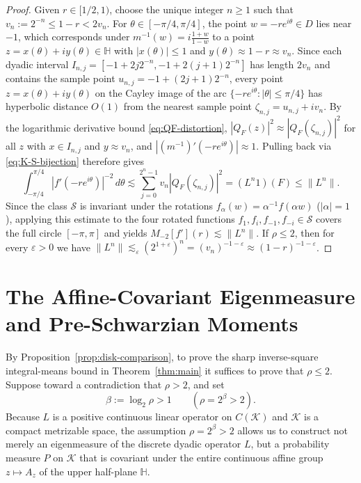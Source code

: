 \documentclass[12pt]{article}
\def\H{\mathbb{H}}
\def\K{\mathcal{K}}
\def\S{\mathcal{S}}
\theoremstyle{definition}
\numberwithin{equation}{section}
\begin{document}
\begin{proof}
Given $r \in [1/2, 1)$, choose the unique integer $n \ge 1$ such that $v_n := 2^{-n} \le 1 - r < 2 v_n$. For $\theta \in [-\pi/4, \pi/4]$, the point $w = -r e^{i\theta} \in D$ lies near $-1$, which corresponds under $m^{-1}(w) = i\frac{1+w}{1-w}$ to a point $z = x(\theta) + i y(\theta) \in \H$ with $|x(\theta)| \le 1$ and $y(\theta) \approx 1 - r \approx v_n$. Since each dyadic interval $I_{n, j} = [-1 + 2j 2^{-n}, -1 + 2(j+1)2^{-n}]$ has length $2 v_n$ and contains the sample point $u_{n, j} = -1 + (2j+1)2^{-n}$, every point $z = x(\theta) + i y(\theta)$ on the Cayley image of the arc $\{ -r e^{i\theta} : |\theta| \le \pi/4\}$ has hyperbolic distance $O(1)$ from the nearest sample point $\zeta_{n, j} = u_{n, j} + i v_n$. By the logarithmic derivative bound \eqref{eq:QF-distortion}, $|Q_F(z)|^2 \approx |Q_F(\zeta_{n, j})|^2$ for all $z$ with $x \in I_{n, j}$ and $y \approx v_n$, and $|(m^{-1})'(-re^{i\theta})| \approx 1$. Pulling back via \eqref{eq:K-S-bijection} therefore gives
\[
  \int_{-\pi/4}^{\pi/4} |f'(-r e^{i\theta})|^{-2} \, d\theta \lesssim \sum_{j=0}^{2^n-1} v_n |Q_F(\zeta_{n, j})|^2 = (L^n 1)(F) \le \|L^n\|.
\]
Since the class $\S$ is invariant under the rotations $f_\alpha(w) = \alpha^{-1} f(\alpha w)$ ($|\alpha| = 1$), applying this estimate to the four rotated functions $f_1, f_i, f_{-1}, f_{-i} \in \S$ covers the full circle $[-\pi, \pi]$ and yields $M_{-2}[f'](r) \lesssim \|L^n\|$. If $\rho \le 2$, then for every $\varepsilon > 0$ we have $\|L^n\| \lesssim_\varepsilon (2^{1+\varepsilon})^n = (v_n)^{-1-\varepsilon} \approx (1-r)^{-1-\varepsilon}$.
\end{proof}

\section{The Affine-Covariant Eigenmeasure and Pre-Schwarzian Moments}

By Proposition~\ref{prop:disk-comparison}, to prove the sharp inverse-square integral-means bound in Theorem~\ref{thm:main} it suffices to prove that $\rho \le 2$. Suppose toward a contradiction that $\rho > 2$, and set
\begin{equation}\label{eq:beta-def}
  \beta := \log_2 \rho > 1 \qquad (\rho = 2^\beta > 2).
\end{equation}
Because $L$ is a positive continuous linear operator on $C(\K)$ and $\K$ is a compact metrizable space, the assumption $\rho = 2^\beta > 2$ allows us to construct not merely an eigenmeasure of the discrete dyadic operator $L$, but a probability measure $P$ on $\K$ that is covariant under the entire continuous affine group $z \mapsto A_z$ of the upper half-plane $\H$.
\end{document}
